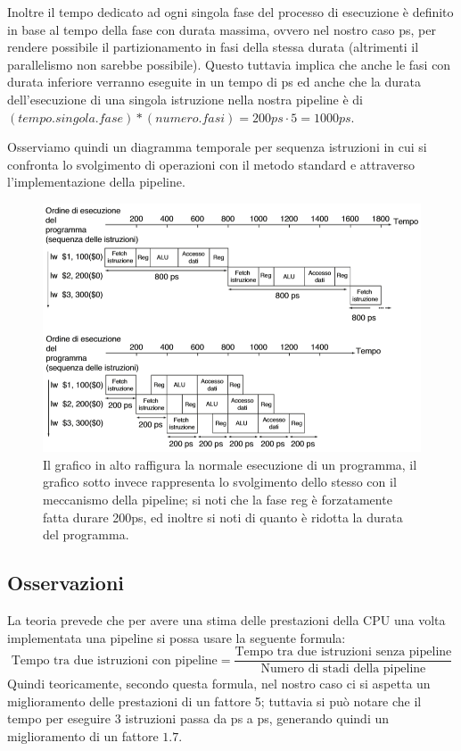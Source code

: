 \documentclass[class=book, crop=false, oneside]{standalone}
\begin{document}
Inoltre il tempo dedicato ad ogni singola fase del processo di esecuzione è definito in base al tempo della fase con durata massima, ovvero nel nostro caso \unit[200]{ps}, per rendere possibile il partizionamento in fasi della stessa durata (altrimenti il parallelismo non sarebbe possibile).
Questo tuttavia implica che anche le fasi con durata inferiore verranno eseguite in un tempo di \unit[200]{ps} ed anche che la durata dell'esecuzione di una singola istruzione nella nostra pipeline è di \((tempo.singola.fase)*(numero.fasi)=200ps\cdot 5=1000ps\).

Osserviamo quindi un diagramma temporale per sequenza istruzioni in cui si confronta lo svolgimento di operazioni con il metodo standard e attraverso l'implementazione della pipeline.
\begin{figure}
	\centering
	\includegraphics[width=\textwidth,keepaspectratio]{esecuzione-operazioni-confronto.png}
	\caption{Il grafico in alto raffigura la normale esecuzione di un programma, il grafico sotto invece rappresenta lo svolgimento dello stesso con il meccanismo della pipeline; si noti che la fase reg è forzatamente fatta durare 200ps, ed inoltre si noti di quanto è ridotta la durata del programma.}
\end{figure}

\subsection{Osservazioni}
La teoria prevede che per avere una stima delle prestazioni della CPU una volta implementata una pipeline si possa usare la seguente formula:
\begin{equation*}
\text{Tempo tra due istruzioni con pipeline} = \frac{\text{Tempo tra due istruzioni senza pipeline}}{\text{Numero di stadi della pipeline}}
\end{equation*}
Quindi teoricamente, secondo questa formula, nel nostro caso ci si aspetta un miglioramento delle prestazioni di un fattore 5; tuttavia si può notare che il tempo per eseguire 3 istruzioni passa da \unit[2400]{ps} a \unit[1400]{ps}, generando quindi un miglioramento di un fattore \(1.7\).
\end{document}
